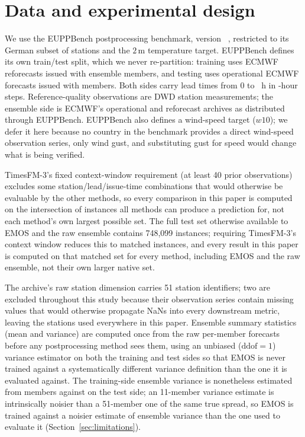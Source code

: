 \section{Data and experimental design}
\label{sec:data}

We use the EUPPBench postprocessing benchmark, version~\EuppbenchVersion{}
\citep{demaeyer_2023_euppbench}, restricted to its German subset of
\NStations{} stations and the \(2\,\mathrm{m}\) temperature target. EUPPBench
defines its own train/test split, which we never re-partition: training
uses ECMWF reforecasts issued \TrainYearRange{} with
\TrainEnsembleMembers{} ensemble members, and testing uses operational
ECMWF forecasts issued \TestYearRange{} with \TestEnsembleMembers{}
members. Both sides carry \NLeadTimes{} lead times from 0 to
\MaxLeadHours{}~h in \LeadStepHours{}-hour steps. Reference-quality
observations are DWD station measurements; the ensemble side is ECMWF's
operational and reforecast archives as distributed through EUPPBench.
EUPPBench also defines a wind-speed target (\(w10\)); we defer it here
because no country in the benchmark provides a direct wind-speed
observation series, only wind gust, and substituting gust for speed would
change what is being verified.

TimesFM-3's fixed context-window requirement (at least 40 prior
observations) excludes some station/lead/issue-time combinations that would
otherwise be evaluable by the other methods, so every comparison in this
paper is computed on the intersection of instances all methods can produce
a prediction for, not each method's own largest possible set. The full test
set otherwise available to EMOS and the raw ensemble contains 748{,}099
instances; requiring TimesFM-3's context window reduces this to
\NMatchedInstances{} matched instances, and every result in this paper is
computed on that matched set for every method, including EMOS and the raw
ensemble, not their own larger native set.

The archive's raw station dimension carries 51 station identifiers; two are
excluded throughout this study because their observation series contain
missing values that would otherwise propagate NaNs into every downstream
metric, leaving the \NStations{} stations used everywhere in this paper.
Ensemble summary statistics (mean and variance) are computed once from the
raw per-member forecasts before any postprocessing method sees them, using
an unbiased (\(\mathrm{ddof}=1\)) variance estimator on both the training
and test sides so that EMOS is never trained against a systematically
different variance definition than the one it is evaluated against. The
training-side ensemble variance is nonetheless estimated from
\TrainEnsembleMembers{} members against \TestEnsembleMembers{} on the test
side; an 11-member variance estimate is intrinsically noisier than a
51-member one of the same true spread, so EMOS is trained against a
noisier estimate of ensemble variance than the one used to evaluate it
(Section~\ref{sec:limitations}).

